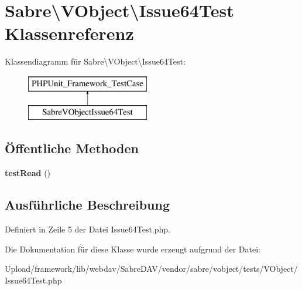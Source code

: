 \hypertarget{class_sabre_1_1_v_object_1_1_issue64_test}{}\section{Sabre\textbackslash{}V\+Object\textbackslash{}Issue64\+Test Klassenreferenz}
\label{class_sabre_1_1_v_object_1_1_issue64_test}
Klassendiagramm für Sabre\textbackslash{}V\+Object\textbackslash{}Issue64\+Test\+:\begin{figure}[H]
\begin{center}
\leavevmode
\includegraphics[height=2.000000cm]{class_sabre_1_1_v_object_1_1_issue64_test}
\end{center}
\end{figure}
\subsection*{Öffentliche Methoden}
\begin{DoxyCompactItemize}
\item 
\mbox{\label{class_sabre_1_1_v_object_1_1_issue64_test_a6900fbdb85c9bf06ba3f06dca25bb340}} 
{\bfseries test\+Read} ()
\end{DoxyCompactItemize}


\subsection{Ausführliche Beschreibung}


Definiert in Zeile 5 der Datei Issue64\+Test.\+php.



Die Dokumentation für diese Klasse wurde erzeugt aufgrund der Datei\+:\begin{DoxyCompactItemize}
\item 
Upload/framework/lib/webdav/\+Sabre\+D\+A\+V/vendor/sabre/vobject/tests/\+V\+Object/Issue64\+Test.\+php\end{DoxyCompactItemize}
